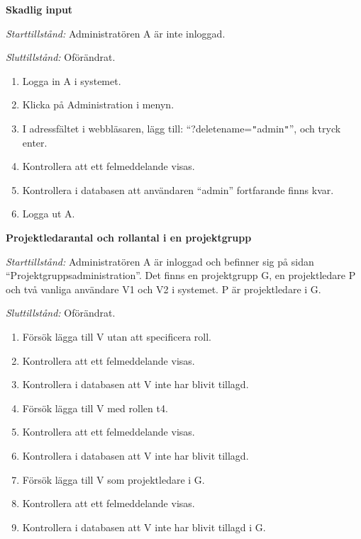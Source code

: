 \documentclass[a4paper]{article}
\begin{document}
\begin{FT}
\item \textbf{Skadlig input}

\emph{Starttillstånd:} Administratören A är inte inloggad.

\emph{Sluttillstånd:} Oförändrat.

\begin{enumerate}
\item Logga in A i systemet.
\item Klicka på Administration i menyn.
\item I adressfältet i webbläsaren, lägg till: ``?deletename=\texttt{"}admin\texttt{"}'', och tryck enter.
\item Kontrollera att ett felmeddelande visas.
\item Kontrollera i databasen att användaren ``admin'' fortfarande finns kvar.
\item Logga ut A.
\end{enumerate}

\item \textbf{Projektledarantal och rollantal i en projektgrupp}

\emph{Starttillstånd:} Administratören A är inloggad och befinner sig på sidan ``Projektgruppsadministration''. Det finns en projektgrupp G, en projektledare P och två vanliga användare V1 och V2 i systemet. P är projektledare i G.

\emph{Sluttillstånd:} Oförändrat.

\begin{enumerate}
\item Försök lägga till V utan att specificera roll.
\item Kontrollera att ett felmeddelande visas.
\item Kontrollera i databasen att V inte har blivit tillagd.
\item Försök lägga till V med rollen t4.
\item Kontrollera att ett felmeddelande visas.
\item Kontrollera i databasen att V inte har blivit tillagd.
\item Försök lägga till V som projektledare i G.
\item Kontrollera att ett felmeddelande visas.
\item Kontrollera i databasen att V inte har blivit tillagd i G.
\end{enumerate}
\end{FT}

\end{document}

